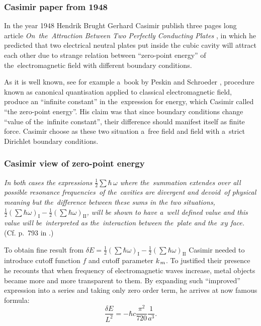 \documentclass[10pt,t]{beamer}
\begin{document}
\begin{frame}
  \frametitle{Casimir paper from 1948}


  In the year 1948 Hendrik Brught Gerhard Casimir publish three pages
  long article \textit{On~the~Attraction Between Two Perfectly Conducting
    Plates} \parencite{Casimir-On-the-Attraction-Between-ETC-Pub-1948}, in
  which he predicted that two electrical neutral plates put inside the cubic
  cavity will attract each other due to strange relation between ``zero-point
  energy'' of the~electromagnetic field with different boundary conditions.

  As it is well known, see for example a~book by Peskin and Schroeder
  \parencite{Peskin-Schroeder-An-Introduction-to-Quantum-Field-Theory-Pub-1995},
  procedure known as canonical quantisation applied to classical
  electromagnetic field, produce an ``infinite constant'' in the~expression
  for energy, which Casimir called ``the zero-point energy''. His claim
  was that since boundary conditions change ``value of the~infinite
  constant'', their difference should manifest itself as finite force.
  Casimir choose as these two situation a~free field and field with a~strict
  Dirichlet boundary conditions.

\end{frame}





\begin{frame}
  \frametitle{Casimir view of zero-point energy}


  \textit{In both cases the expressions $\frac{ 1 }{ 2 } \sum \hbar \, \omega$ where
    the~summation extendes over all possible resonance frequencies~of
    the~cavities are divergent and devoid~of physical meaning but
    the~\textit{difference} between these sums in the two situations,
    $\frac{ 1 }{ 2 } ( \sum \hbar \omega )_{ \text{I} } -
    \frac{ 1 }{ 2 } ( \sum \hbar \omega )_{ \text{II} }$, will be shown to have
    a~well defined value and this value will be~interpreted as
    the~interaction between the~plate and the~$xy$ face.} (Cf. p.~793 in
  \parencite{Casimir-On-the-Attraction-Between-ETC-Pub-1948}.)

  To obtain fine result from
  $\delta E = \frac{ 1 }{ 2 } ( \sum \hbar \omega )_{ \text{I} } -
  \frac{ 1 }{ 2 } ( \sum \hbar \omega )_{ \text{II} }$ Casimir needed to introduce
  cutoff function{ } $f$ and cutoff parameter $k_{ \hspace{0.09em} m }$. To
  justified their presence he
  recounts that when frequency of electromagnetic
  waves increase, metal objects became more and more transparent to them.
  By expanding such ``improved'' expression into a series and taking only
  zero order term, he arrives at now famous formula:
  \begin{equation}
    \label{eq:First-theoretical-works-01}
    \frac{ \delta E }{ L^{ 2 } } =
    -\hbar c \frac{ \pi^{ 2 } }{ 720 } \frac{ 1 }{ a^{ 3 } }.
  \end{equation}

\end{frame}
\end{document}
